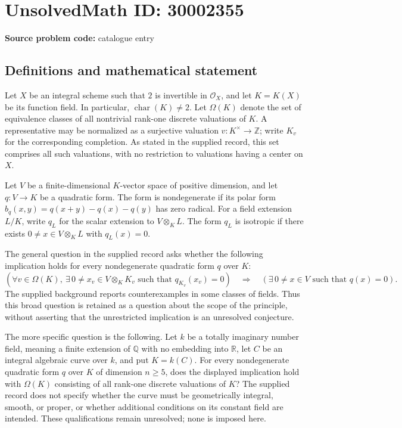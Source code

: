 \documentclass[11pt]{article}
\newcommand{\Z}{\mathbb{Z}}
\newcommand{\Q}{\mathbb{Q}}
\newcommand{\R}{\mathbb{R}}
\begin{document}
\section*{UnsolvedMath ID: 30002355}
\textbf{Source problem code:} catalogue entry
\subsection{Definitions and mathematical statement}
Let \(X\) be an integral scheme such that \(2\) is invertible in \(\mathcal O_X\), and let \(K=K(X)\) be its function field. In particular, \(\operatorname{char}(K)\ne 2\). Let \(\Omega(K)\) denote the set of equivalence classes of all nontrivial rank-one discrete valuations of \(K\). A representative may be normalized as a surjective valuation \(v:K^\times\to\Z\); write \(K_v\) for the corresponding completion. As stated in the supplied record, this set comprises all such valuations, with no restriction to valuations having a center on \(X\).

Let \(V\) be a finite-dimensional \(K\)-vector space of positive dimension, and let \(q:V\to K\) be a quadratic form. The form is nondegenerate if its polar form \(b_q(x,y)=q(x+y)-q(x)-q(y)\) has zero radical. For a field extension \(L/K\), write \(q_L\) for the scalar extension to \(V\otimes_K L\). The form \(q_L\) is isotropic if there exists \(0\ne x\in V\otimes_K L\) with \(q_L(x)=0\).

The general question in the supplied record asks whether the following implication holds for every nondegenerate quadratic form \(q\) over \(K\):
\[
\left(\forall v\in\Omega(K),\ \exists\,0\ne x_v\in V\otimes_K K_v\text{ such that }q_{K_v}(x_v)=0\right)
\quad\Longrightarrow\quad
\left(\exists\,0\ne x\in V\text{ such that }q(x)=0\right).
\]
The supplied background reports counterexamples in some classes of fields. Thus this broad question is retained as a question about the scope of the principle, without asserting that the unrestricted implication is an unresolved conjecture.

The more specific question is the following. Let \(k\) be a totally imaginary number field, meaning a finite extension of \(\Q\) with no embedding into \(\R\), let \(C\) be an integral algebraic curve over \(k\), and put \(K=k(C)\). For every nondegenerate quadratic form \(q\) over \(K\) of dimension \(n\ge 5\), does the displayed implication hold with \(\Omega(K)\) consisting of all rank-one discrete valuations of \(K\)? The supplied record does not specify whether the curve must be geometrically integral, smooth, or proper, or whether additional conditions on its constant field are intended. These qualifications remain unresolved; none is imposed here.
\end{document}
